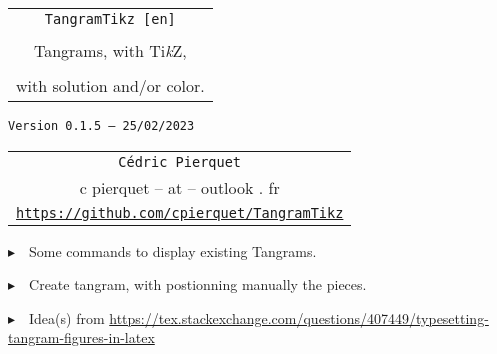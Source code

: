 \documentclass{article}
\def\TPversion{0.1.5}
\def\TPdate{25/02/2023}
\begin{document}
\pagestyle{fancy}

\thispagestyle{empty}

\vspace{2cm}

\begin{center}
	\begin{minipage}{0.75\linewidth}
	\begin{tcolorbox}[colframe=yellow,colback=yellow!15]
		\begin{center}
			\begin{tabular}{c}
				{\Huge \texttt{TangramTikz [en]}}\\
				\\
				{\LARGE Tangrams, with Ti\textit{k}Z}, \\
				\\
				{\LARGE with solution and/or color.} \\
			\end{tabular}
			
			\medskip
			
			{\small \texttt{Version \TPversion{} -- \TPdate}}
		\end{center}
	\end{tcolorbox}
\end{minipage}
\end{center}

\vspace{0.5cm}

\begin{center}
	\begin{tabular}{c}
	\texttt{Cédric Pierquet}\\
	{\ttfamily c pierquet -- at -- outlook . fr}\\
	\texttt{\url{https://github.com/cpierquet/TangramTikz}}
\end{tabular}
\end{center}

\vspace{0.5cm}

{$\blacktriangleright$~~Some commands to display existing Tangrams.}

\smallskip

{$\blacktriangleright$~~Create tangram, with postionning manually the pieces.}

\smallskip

{$\blacktriangleright$~~Idea(s) from \url{https://tex.stackexchange.com/questions/407449/typesetting-tangram-figures-in-latex}}

\vspace{1cm}
\end{document}
